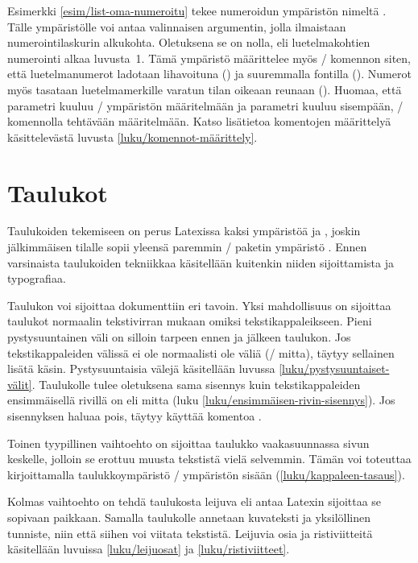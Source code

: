 Esimerkki \ref{esim/list-oma-numeroitu} tekee numeroidun ympäristön
nimeltä . Tälle ympäristölle voi antaa valinnaisen
argumentin, jolla ilmaistaan numerointilaskurin alkukohta. Oletuksena se
on nolla, eli luetelmakohtien numerointi alkaa luvusta~1. Tämä ympäristö
määrittelee myös \-/ komennon siten, että
luetelmanumerot ladotaan lihavoituna () ja suuremmalla
fontilla (). Numerot myös tasataan luetelmamerkille
varatun tilan oikeaan reunaan (). Huomaa, että parametri
 kuuluu \-/ ympäristön määritelmään ja
parametri  kuuluu sisempään, \-/
komennolla tehtävään määritelmään. Katso lisätietoa komentojen
määrittelyä käsittelevästä luvusta \ref{luku/komennot-määrittely}.

\section{Taulukot}
\label{luku/taulukot}

Taulukoiden tekemiseen on perus Latexissa kaksi ympäristöä
 ja , joskin jälkimmäisen tilalle
sopii yleensä paremmin \-/ paketin ympäristö
. Ennen varsinaista taulukoiden tekniikkaa
käsitellään kuitenkin niiden sijoittamista ja typografiaa.

Taulukon voi sijoittaa dokumenttiin eri tavoin. Yksi mahdollisuus on
sijoittaa taulukot normaalin tekstivirran mukaan omiksi
tekstikappaleikseen. Pieni pystysuuntainen väli on silloin tarpeen ennen
ja jälkeen taulukon. Jos tekstikappaleiden välissä ei ole normaalisti
ole väliä (\-/ mitta), täytyy sellainen lisätä käsin.
Pystysuuntaisia välejä käsitellään luvussa
\ref{luku/pystysuuntaiset-välit}. Taulukolle tulee oletuksena sama
sisennys kuin tekstikappaleiden ensimmäisellä rivillä on eli mitta
 (luku \ref{luku/ensimmäisen-rivin-sisennys}). Jos
sisennyksen haluaa pois, täytyy käyttää komentoa .

Toinen tyypillinen vaihtoehto on sijoittaa taulukko vaakasuunnassa sivun
keskelle, jolloin se erottuu muusta tekstistä vielä selvemmin. Tämän voi
toteuttaa kirjoittamalla taulukkoympäristö \-/
ympäristön sisään (\ref{luku/kappaleen-tasaus}).

Kolmas vaihtoehto on tehdä taulukosta leijuva eli antaa Latexin
sijoittaa se sopivaan paikkaan. Samalla taulukolle annetaan kuvateksti
ja yksilöllinen tunniste, niin että siihen voi viitata tekstistä.
Leijuvia osia ja ristiviitteitä käsitellään luvuissa
\ref{luku/leijuosat} ja \ref{luku/ristiviitteet}.

